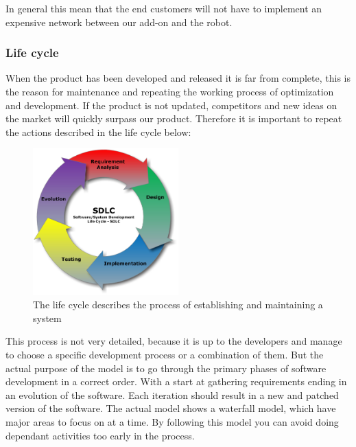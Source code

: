 In general this mean that the end customers will not have to implement an expensive network between our add-on and the robot. 

\subsubsection{Life cycle}

When the product has been developed and released it is far from complete, this is the reason for maintenance and repeating the working process of optimization and development. If the product is not updated, competitors and new ideas on the market will quickly surpass our product. Therefore it is important to repeat the actions described in the life cycle below:
\clearpage

\begin{figure}[ht]
\centering
\includegraphics[width=0.5\textwidth]{graphics/Software_Development_Life_Cycle}
\caption{The life cycle describes the process of establishing and maintaining a system}
\label{SDLC}
\end{figure}
This process is not very detailed, because it is up to the developers and manage to choose a specific development process or a combination of them. But the actual purpose of the model is to go through the primary phases of software development in a correct order. With a start at gathering requirements ending in an evolution of the software. Each iteration should result in a new and patched version of the software. The actual model shows a waterfall model, which have major areas to focus on at a time. By following this model you can avoid doing dependant activities too early in the process.
